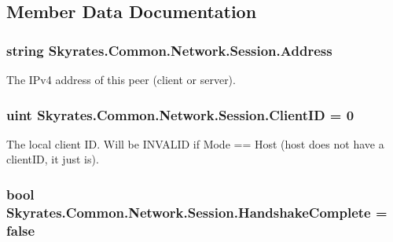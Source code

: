 \subsection{Member Data Documentation}
\hypertarget{class_skyrates_1_1_common_1_1_network_1_1_session_ac6ecaf40c7cae0c6c7d6e8de1b2a892c}{
\subsubsection[{Address}]{\setlength{\rightskip}{0pt plus 5cm}string Skyrates.\-Common.\-Network.\-Session.\-Address}}\label{class_skyrates_1_1_common_1_1_network_1_1_session_ac6ecaf40c7cae0c6c7d6e8de1b2a892c}


The I\-Pv4 address of this peer (client or server). 

\hypertarget{class_skyrates_1_1_common_1_1_network_1_1_session_aac06adc8a6108e66ce1c465f60d9f95e}{
\subsubsection[{Client\-I\-D}]{\setlength{\rightskip}{0pt plus 5cm}uint Skyrates.\-Common.\-Network.\-Session.\-Client\-I\-D = 0}}\label{class_skyrates_1_1_common_1_1_network_1_1_session_aac06adc8a6108e66ce1c465f60d9f95e}


The local client I\-D. Will be I\-N\-V\-A\-L\-I\-D if Mode == Host (host does not have a client\-I\-D, it just is). 

\hypertarget{class_skyrates_1_1_common_1_1_network_1_1_session_aa819705fe7a825f718a25cf932471a47}{
\subsubsection[{Handshake\-Complete}]{\setlength{\rightskip}{0pt plus 5cm}bool Skyrates.\-Common.\-Network.\-Session.\-Handshake\-Complete = false}}\label{class_skyrates_1_1_common_1_1_network_1_1_session_aa819705fe7a825f718a25cf932471a47}



